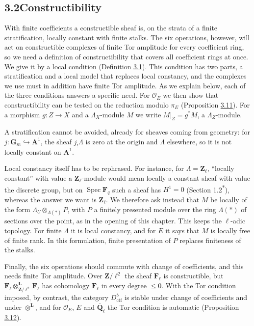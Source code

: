 \documentclass[11pt]{article}
\newcommand{\bpout}[1]{#1\textsuperscript{\hyperlink{bp-outside}{\ensuremath{\ast}}}}
\begin{document}
\subsection*{\texorpdfstring{3.2\quad Constructibility}{3.2 Constructibility}}
\label{bp5}%
\label{bp6}%
With finite coefficients a constructible sheaf is, on the strata of a finite stratification, locally constant with finite stalks. The six operations, however, will act on constructible complexes of finite Tor amplitude for every coefficient ring, so we need a definition of constructibility that covers all coefficient rings at once. We give it by a local condition (Definition \hyperref[bp7]{3.1}). This condition has two parts, a stratification and a local model that replaces local constancy, and the complexes we use must in addition have finite Tor amplitude. As we explain below, each of the three conditions answers a specific need. For \(\mathcal O_E\) we then show that constructibility can be tested on the reduction modulo \(\pi_E\) (Proposition \hyperref[bp34]{3.11}). For a morphism \(g:Z\to X\) and a \(\Lambda_X\)-module \(M\) we write \(M|_Z=g^*M\), a \(\Lambda_Z\)-module.

A stratification cannot be avoided, already for sheaves coming from geometry: for \(j:\mathbf G_m\hookrightarrow\mathbf A^1\), the sheaf \(j_!\Lambda\) is zero at the origin and \(\Lambda\) elsewhere, so it is not locally constant on \(\mathbf A^1\).

Local constancy itself has to be rephrased. For instance, for \(\Lambda=\mathbf Z_\ell\), “locally constant” with value a \(\mathbf Z_\ell\)-module would mean locally a constant sheaf with value the discrete group, but on \(\operatorname{Spec}\mathbf F_q\) such a sheaf has \(H^1=0\) (Section \bpout{1.2}), whereas the answer we want is \(\mathbf Z_\ell\). We therefore ask instead that \(M\) be locally of the form \(\Lambda_U\otimes_{\Lambda(*)}P\), with \(P\) a finitely presented module over the ring \(\Lambda(*)\) of sections over the point, as in the opening of this chapter. This keeps the \(\ell\)-adic topology. For finite \(\Lambda\) it is local constancy, and for \(E\) it says that \(M\) is locally free of finite rank. In this formulation, finite presentation of \(P\) replaces finiteness of the stalks.

Finally, the six operations should commute with change of coefficients, and this needs finite Tor amplitude. Over \(\mathbf Z/\ell^2\) the sheaf \(\mathbf F_\ell\) is constructible, but \(\mathbf F_\ell\otimes^{\mathbf L}_{\mathbf Z/\ell^2}\mathbf F_\ell\) has cohomology \(\mathbf F_\ell\) in every degree \(\leq0\). With the Tor condition imposed, by contrast, the category \(D^b_{\mathrm{ctf}}\) is stable under change of coefficients and under \(\otimes^{\mathbf L}\), and for \(\mathcal O_E\), \(E\) and \(\overline{\mathbf Q}_\ell\) the Tor condition is automatic (Proposition \hyperref[bp40]{3.12}).
\end{document}
